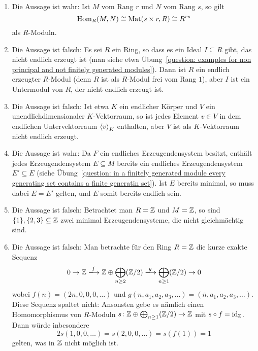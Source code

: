 \begin{solution}
\begin{enumerate}
    \item
      Die Aussage ist wahr:
      Ist $M$ vom Rang $r$ und $N$ vom Rang $s$, so gilt
      \[
              \operatorname{Hom}_R(M,N)
        \cong \operatorname{Mat}(s \times r, R)
        \cong R^{rs}
      \]
      als $R$-Moduln.
      
    \item
      Die Aussage ist falsch:
      Es sei $R$ ein Ring, so dass es ein Ideal $I \subseteq R$ gibt, das nicht endlich erzeugt ist (man siehe etwa Übung~\ref{question: examples for non principal and not finitely generated modules}).
      Dann ist $R$ ein endlich erzeugter $R$-Modul (denn $R$ ist als $R$-Modul frei vom Rang $1$), aber $I$ ist ein Untermodul von $R$, der nicht endlich erzeugt ist.
      
    \item
      Die Aussage ist falsch:
      Ist etwa $K$ ein endlicher Körper und $V$ ein unendlichdimensionaler $K$-Vektorraum, so ist jedes Element $v \in V$ in dem endlichen Untervektorraum $\left\langle v \right\rangle_K$ enthalten, aber $V$ ist als $K$-Vektorraum nicht endlich erzeugt.
      
    \item
      Die Aussage ist wahr:
      Da $F$ ein endliches Erzeugendensystem besitzt, enthält jedes Erzeugendensystem $E \subseteq M$ bereits ein endliches Erzeugendensystem $E' \subseteq E$ (siehe Übung~\ref{question: in a finitely generated module every generating set contains a finite generatin set}).
      Ist $E$ bereits minimal, so muss dabei $E = E'$ gelten, und $E$ somit bereits endlich sein.
      
    \item
      Die Aussage ist falsch:
      Betrachtet man $R = \mathbb{Z}$ und $M = \mathbb{Z}$, so sind $\{1\}, \{2, 3\} \subseteq \mathbb{Z}$ zwei minimal Erzeugendensysteme, die nicht gleichmächtig sind.
      
    \item
      Die Aussage ist falsch:
      Man betrachte für den Ring $R = \mathbb{Z}$ die kurze exakte Sequenz
      \[
                            0
        \to                 \Integer
        \xlongrightarrow{f} \Integer \oplus \bigoplus_{n \geq 2} (\Integer/2)
        \xlongrightarrow{g} \bigoplus_{n \geq 1} (\Integer/2)
        \to                 0
      \]
      wobei $f(n) = (2n,0,0,0,\dotsc)$ und $g(n, a_1, a_2, a_3, \dotsc) = (\overline{n}, a_1, a_2, a_3, \dotsc)$.
      Diese Sequenz spaltet nicht:
      Ansonsten gebe es nämlich einen Homomorphismus von $R$-Moduln $s \colon \mathbb{Z} \oplus \bigoplus_{n \geq 1} (\mathbb{Z}/2) \to \mathbb{Z}$ mit $s \circ f = \operatorname{id}_{\mathbb{Z}}$.
      Dann würde inbesondere
      \[
          2 s(1,0,0,\dotsc)
        = s(2,0,0,\dotsc)
        = s(f(1))
        = 1
      \]
      gelten, was in $\mathbb{Z}$ nicht möglich ist.
      

\end{enumerate}
\end{solution}
